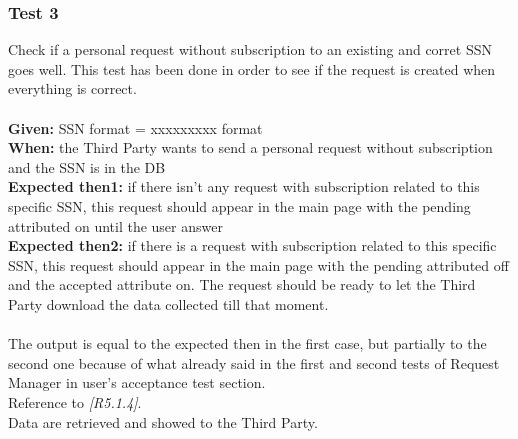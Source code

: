 \subsubsection{\Large{Test 3}}
Check if a personal request without subscription to an existing and corret SSN goes well. This test has been done in order to see if the request is created when everything is correct.\\
\\
\textbf{Given: } SSN format = xxxxxxxxx format \\
\textbf{When: } the Third Party wants to send a personal request without subscription and the SSN is in the DB \\
\textbf{Expected then1: } if there isn't any request with subscription related to this specific SSN, this request should appear in the main page with the pending attributed on until the user answer\\
\textbf{Expected then2: } if there is a request with subscription related to this specific SSN, this request should appear in the main page with the pending attributed off and the accepted  attribute on. The request should be ready to let the Third Party download the data collected till that moment.\\
\\
The output is equal to the expected then in the first case, but partially to the second one because of what already said in the first and second tests of Request Manager in user's acceptance test section.\\ 
Reference to \textit{[R5.1.4]}.\\
Data are retrieved and showed to the Third Party.

